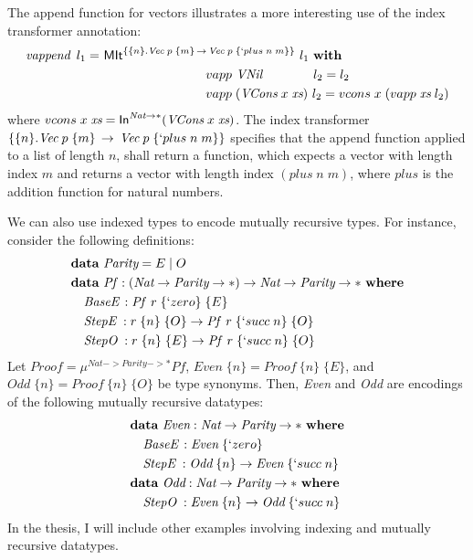 The append function for vectors illustrates a more interesting use of
the index transformer annotation:
\begin{align*}
\textit{vappend}~\,l_1 =~ &
 \textsf{MIt}^{\{\{n\} . \textit{Vec}\;p\;\{m\} \, -> \, \textit{Vec}\;p\;\{`plus\;n\;m\}\}}~l_1
 ~\textbf{with} \\
&\qquad\qquad\qquad\qquad  vapp ~\textit{VNil}~~~~~~~~~~~ ~ l_2 = l_2 \\
&\qquad\qquad\qquad\qquad  vapp \;(\textit{VCons}\;x\;\textit{xs}) ~ l_2 = vcons\;x\;(vapp\;\textit{xs}\;l_2)
\end{align*}
where $vcons\;x\;\textit{xs} = \textsf{In}^{\textit{Nat} -> *}(\textit{VCons}\;x\;\textit{xs})$.
The index transformer
$\{\{n\} . \textit{Vec}\;p\;\{m\} \, -> \, \textit{Vec}\;p\;\{`plus\;n\;m\}\}$
specifies that the append function applied to a list of length $n$,
shall return a function, which expects a vector with length index $m$
and returns a vector with length index $(plus\;n\;m)$, where $plus$ is
the addition function for natural numbers.

We can also use indexed types to encode mutually recursive types.
For instance, consider the following definitions:
\begin{align*}
&\textbf{data}~ \textit{Parity} = E \mid O \\
&\textbf{data}~ \textit{Pf}\, : (\textit{Nat} -> \textit{Parity} -> *) ->
                                    \textit{Nat} -> \textit{Parity} -> *
  ~\textbf{where}\\
&\quad \textit{BaseE}\, : \textit{Pf}~\,r\;\{`zero\}\;\{E\} \\
&\quad \textit{StepE}\; : r\;\{n\}\;\{O\} -> \textit{Pf}~\,r\;\{`succ\;n\}\;\{O\} \\
&\quad \textit{StepO}\; : r\;\{n\}\;\{E\} -> \textit{Pf}~\,r\;\{`succ\;n\}\;\{O\}
\end{align*}
Let $\textit{Proof} = \mu^{\textit{Nat} -> \textit{Parity} -> *} \textit{Pf}$,
$\textit{Even}\;\{n\} = \textit{Proof}~\{n\}\;\{E\}$, and
$\textit{Odd}\;\{n\} = \textit{Proof}~\{n\}\;\{O\}$ be type synonyms.
Then, \textit{Even} and \textit{Odd} are encodings of the following
mutually recursive datatypes:
\begin{align*}
&\textbf{data}~\textit{Even} : \textit{Nat} -> \textit{Parity} -> *
 ~\textbf{where} \\
&\quad \textit{BaseE}\, : \textit{Even}\;\{`zero\}\\
&\quad \textit{StepE}\; : \textit{Odd}\;\{n\} -> \textit{Even}\;\{`succ\;n\} \\
&\textbf{data}~\textit{Odd} : \textit{Nat} -> \textit{Parity} -> *
 ~\textbf{where} \\
&\quad \textit{StepO}\; : \textit{Even}\;\{n\} -> \textit{Odd}\;\{`succ\;n\}
\end{align*}
In the thesis, I will include other examples involving indexing and
mutually recursive datatypes.


